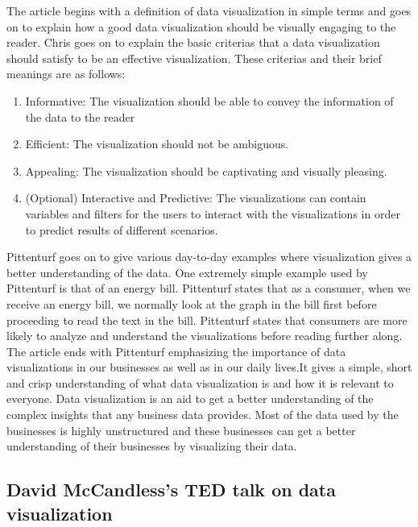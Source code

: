\documentclass[]{book}
\providecommand{\tightlist}{%
  \setlength{\itemsep}{0pt}\setlength{\parskip}{0pt}}
\theoremstyle{definition}
\theoremstyle{definition}
\theoremstyle{definition}
\theoremstyle{remark}
\begin{document}
The article begins with a definition of data visualization in simple
terms and goes on to explain how a good data visualization should be
visually engaging to the reader. Chris goes on to explain the basic
criterias that a data visualization should satisfy to be an effective
visualization. These criterias and their brief meanings are as follows:

\begin{enumerate}
\def\labelenumi{\arabic{enumi}.}
\tightlist
\item
  Informative: The visualization should be able to convey the
  information of the data to the reader
\item
  Efficient: The visualization should not be ambiguous.
\item
  Appealing: The visualization should be captivating and visually
  pleasing.
\item
  (Optional) Interactive and Predictive: The visualizations can contain
  variables and filters for the users to interact with the
  visualizations in order to predict results of different scenarios.
\end{enumerate}

Pittenturf goes on to give various day-to-day examples where
visualization gives a better understanding of the data. One extremely
simple example used by Pittenturf is that of an energy bill. Pittenturf
states that as a consumer, when we receive an energy bill, we normally
look at the graph in the bill first before proceeding to read the text
in the bill. Pittenturf states that consumers are more likely to analyze
and understand the visualizations before reading further along. The
article ends with Pittenturf emphasizing the importance of data
visualizations in our businesses as well as in our daily lives.It gives
a simple, short and crisp understanding of what data visualization is
and how it is relevant to everyone. Data visualization is an aid to get
a better understanding of the complex insights that any business data
provides. Most of the data used by the businesses is highly unstructured
and these businesses can get a better understanding of their businesses
by visualizing their data.

\subsection{David McCandless's TED talk on data
visualization}\label{david-mccandlesss-ted-talk-on-data-visualization}
\end{document}
